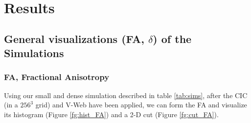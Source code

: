 \documentclass[12pt]{article}
\begin{document}
\section{Results}

\subsection{General visualizations (FA, $\delta$) of the Simulations}

\subsubsection{FA, Fractional Anisotropy}
Using our small and dense simulation described in table \ref{tab:sims}, after the CIC (in a $256^{3}$ grid) and V-Web have been applied, we can form the FA and visualize its histogram (Figure \ref{fg:hist_FA}) and a 2-D cut (Figure \ref{fg:cut_FA}).
\end{document}

